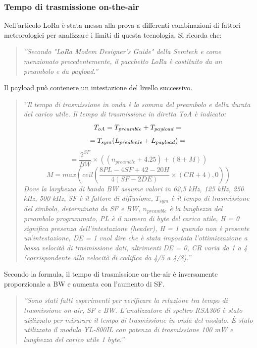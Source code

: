 \documentclass[a4paper]{report} %
\begin{document}
\subsubsection{Tempo di trasmissione on-the-air}
Nell'articolo \cite{art:rif.44} LoRa è stata messa alla prova a differenti combinazioni di fattori meteorologici per analizzare i limiti di questa tecnologia. Si ricorda che:
\begin{quote}
	\textit{''Secondo "LoRa Modem Designer’s Guide" della Semtech e come menzionato precedentemente, il pacchetto LoRa è costituito da un preambolo e da payload.''} 
\end{quote}
Il payload può contenere un intestazione del livello successivo.
\begin{quote} 
	\textit{''Il tempo di trasmissione in onda è la somma del preambolo e della durata del carico utile. Il tempo di trasmissione in diretta ToA è indicato:
\begin{equation}
T_{oA} = T_{preamble} + T_{payload} = \\
\end{equation}
\begin{equation}
= T_{sym}(L_{preabmle}+L_{payload}) = \\
\end{equation}
\begin{equation}
= \frac{2^{SF}}{BW}\times((n_{preamble}+4.25)+(8+M))
\end{equation}
\begin{equation}
M = max(ceil(\frac{8PL-4SF+42-20H}{4(SF-2DE)}\times(CR+4),0))
\end{equation}
	Dove la larghezza di banda BW assume valori in {62,5 kHz, 125 kHz, 250 kHz, 500 kHz}, SF è il fattore di diffusione, $T_{sym}$ è il tempo di trasmissione del simbolo, determinato da SF e BW, $n_{preamble}$ è la lunghezza del preambolo programmato, PL è il numero di byte del carico utile, H = 0 significa presenza dell'intestazione (header), H = 1 quando non è presente un'intestazione, DE = 1 vuol dire che è stata impostata l'ottimizzazione a bassa velocità di trasmissione dati, altrimenti DE = 0, CR varia da 1 a 4 (corrispondente alla velocità di codifica da 4/5 a 4/8).''} 
\end{quote}	
Secondo la formula, il tempo di trasmissione on-the-air è inversamente proporzionale a BW e aumenta con l'aumento di SF.
\begin{quote}
	\textit{''Sono stati fatti esperimenti per verificare la relazione tra tempo di trasmissione on-air, SF e BW. L'analizzatore di spettro RSA306 è stato utilizzato per misurare il tempo di trasmissione in onda del modulo. È stato utilizzato il modulo YL-800IL con potenza di trasmissione 100 mW e lunghezza del carico utile 1 byte.''} 
\end{quote}
\end{document}
